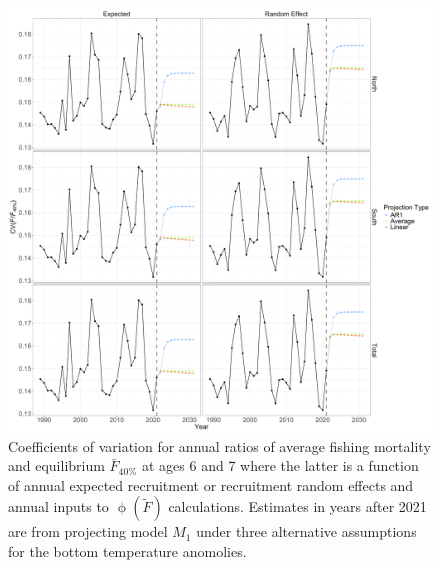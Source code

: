 \documentclass[
]{article}
\begin{document}
\begin{figure}

{\centering \includegraphics[height=0.95\textheight]{proj_F_status_CV} 

}

\caption{Coefficients of variation for annual ratios of average fishing mortality and equilibrium $\bar{F}_{40\%}$ at ages 6 and 7 where the latter is a function of annual expected recruitment or recruitment random effects and annual inputs to $\upphi(\widetilde{F})$ calculations. Estimates in years after 2021 are from projecting model $M_1$ under three alternative assumptions for the bottom temperature anomolies.}\label{fig:annual-F-status-cvs}
\end{figure}
\end{document}
